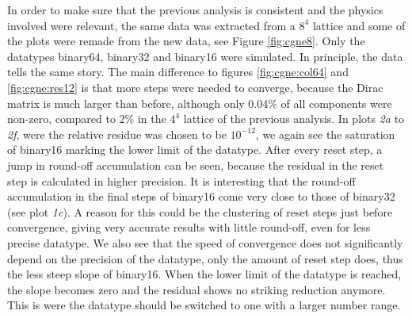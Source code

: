 \documentclass{article}
\theoremstyle{plain} %
\theoremstyle{convention} %
\theoremstyle{remark} %
\numberwithin{equation}{section}
\begin{document}
In order to make sure that the previous analysis is consistent and the physics involved were relevant, the same data was extracted from a $8^4$ lattice and some of the plots were remade from the new data, see Figure \ref{fig:cgne8}. Only the datatypes \gls{binary64}, \gls{binary32} and \gls{binary16} were simulated. In principle, the data tells the same story. The main difference to figures \ref{fig:cgne:col64} and \ref{fig:cgne:res12} is that more steps were needed to converge, because the Dirac matrix is much larger than before, although only \num{0.04}\% of all components were non-zero, compared to \num{2}\% in the $4^4$ lattice of the previous analysis. In plots \textit{2a} to \textit{2f}, were the relative residue was chosen to be $10^{-12}$, we again see the saturation of \gls{binary16} marking the lower limit of the datatype. After every reset step, a jump in round-off accumulation can be seen, because the residual in the reset step is calculated in higher precision. It is interesting that the round-off accumulation in the final steps of \gls{binary16} come very close to those of \gls{binary32} (see plot \textit{1c}). A reason for this could be the clustering of reset steps just before convergence, giving very accurate results with little round-off, even for less precise datatype. We also see that the speed of convergence does not significantly depend on the precision of the datatype, only the amount of reset step does, thus the less steep slope of \gls{binary16}. When the lower limit of the datatype is reached, the slope becomes zero and the residual shows no striking reduction anymore. This is were the datatype should be switched to one with a larger number range.
\end{document}
